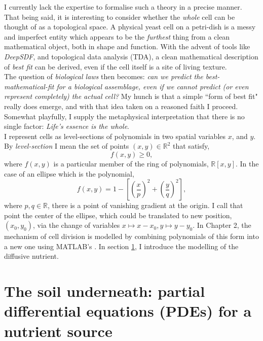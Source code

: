 I currently lack the expertise to formalise 
such a theory in a precise manner. That being said, 
it is interesting to consider whether the \textit{whole}
cell can be thought of as a topological space. A physical
yeast cell on a petri-dish is a messy and imperfect 
entity which appears to be the \textit{furthest} thing from 
a clean mathematical object, both in shape and function.
With the advent of tools like \textit{DeepSDF}, and topological 
data analysis (TDA), a clean mathematical description
of \textit{best fit} can be derived, even if the cell itself 
is a site of living texture. 
\\

The question of \textit{biological laws} 
then becomes: \textit{can we predict the best-mathematical-fit
for a biological assemblage, even if we cannot predict (or even 
represent completely) the actual cell?}
My hunch is that a simple ``form of best fit" really does emerge, 
and with that idea taken on a reasoned faith I proceed. Somewhat 
playfully, I supply the metaphysical interpretation that 
there is no single factor: 
\textit{Life's essence is the whole}.
\\

I represent cells as 
level-sections of polynomials in two spatial 
variables $x$, and $y$. By \textit{level-section} I mean the set of points 
$(x,y) \in \mathbb{R}^2$ that satisfy,
\begin{equation*}
    f(x,y) \geq 0,
\end{equation*}
where $f(x,y)$ is a particular member of the ring of polynomials, $\mathbb{R}[x,y]$.
In the case of an ellipse which is the polynomial, 
\begin{equation*}
    f(x,y) = 1 - \left[\left( \frac{x}{p}\right)^2 + \left( \frac{y}{q}\right)^2\right],
\end{equation*}
where $p,q \in \mathbb{R}$, there is a point of vanishing gradient at the origin. I call 
that point the center of the ellipse, which could be translated 
to new position, $(x_0,y_0)$, via the change of variables $x \mapsto x-x_0, y \mapsto y-y_0.$
In Chapter 2, the mechanism of cell division is modelled by 
combining polynomials of this form into a new one using MATLAB's . 
In section \ref{sec:turingPatterns}, 
I introduce the modelling of the diffusive nutrient.


\section{The soil underneath: partial differential 
equations (PDEs) for a nutrient source} \label{sec:turingPatterns}

